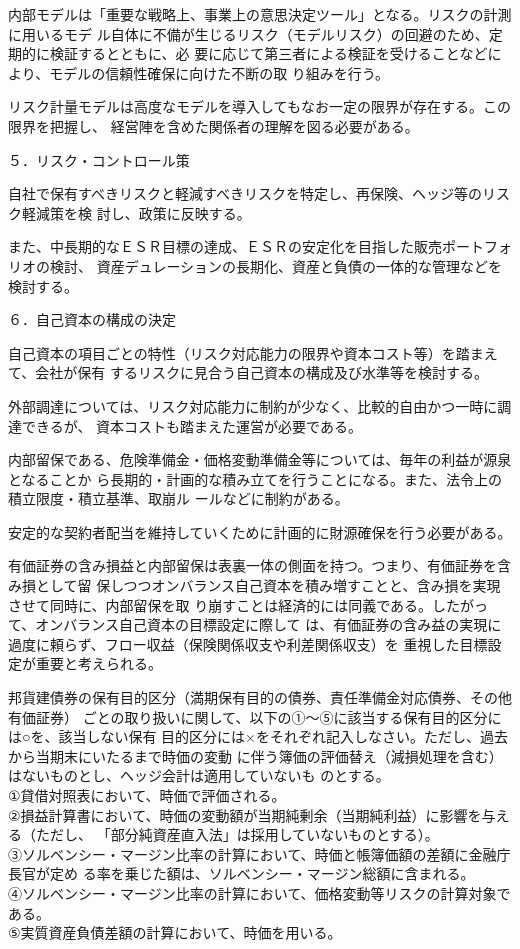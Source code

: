 \documentclass[report,gutter=10mm,fore-edge=10mm,uplatex,dvipdfmx]{jlreq}
\begin{document}
内部モデルは「重要な戦略上、事業上の意思決定ツール」となる。リスクの計測に用いるモデ
ル自体に不備が生じるリスク（モデルリスク）の回避のため、定期的に検証するとともに、必
要に応じて第三者による検証を受けることなどにより、モデルの信頼性確保に向けた不断の取
り組みを行う。

リスク計量モデルは高度なモデルを導入してもなお一定の限界が存在する。この限界を把握し、
経営陣を含めた関係者の理解を図る必要がある。

５．リスク・コントロール策

自社で保有すべきリスクと軽減すべきリスクを特定し、再保険、ヘッジ等のリスク軽減策を検
討し、政策に反映する。

また、中長期的なＥＳＲ目標の達成、ＥＳＲの安定化を目指した販売ポートフォリオの検討、
資産デュレーションの長期化、資産と負債の一体的な管理などを検討する。

６．自己資本の構成の決定

自己資本の項目ごとの特性（リスク対応能力の限界や資本コスト等）を踏まえて、会社が保有
するリスクに見合う自己資本の構成及び水準等を検討する。

外部調達については、リスク対応能力に制約が少なく、比較的自由かつ一時に調達できるが、
資本コストも踏まえた運営が必要である。

内部留保である、危険準備金・価格変動準備金等については、毎年の利益が源泉となることか
ら長期的・計画的な積み立てを行うことになる。また、法令上の積立限度・積立基準、取崩ル
ールなどに制約がある。

安定的な契約者配当を維持していくために計画的に財源確保を行う必要がある。

有価証券の含み損益と内部留保は表裏一体の側面を持つ。つまり、有価証券を含み損として留
保しつつオンバランス自己資本を積み増すことと、含み損を実現させて同時に、内部留保を取
り崩すことは経済的には同義である。したがって、オンバランス自己資本の目標設定に際して
は、有価証券の含み益の実現に過度に頼らず、フロー収益（保険関係収支や利差関係収支）を
重視した目標設定が重要と考えられる。

邦貨建債券の保有目的区分（満期保有目的の債券、責任準備金対応債券、その他有価証券）
ごとの取り扱いに関して、以下の①～⑤に該当する保有目的区分には○を、該当しない保有
目的区分には×をそれぞれ記入しなさい。ただし、過去から当期末にいたるまで時価の変動
に伴う簿価の評価替え（減損処理を含む）はないものとし、ヘッジ会計は適用していないも
のとする。\\
①貸借対照表において、時価で評価される。\\
②損益計算書において、時価の変動額が当期純剰余（当期純利益）に影響を与える（ただし、
「部分純資産直入法」は採用していないものとする）。\\
③ソルベンシー・マージン比率の計算において、時価と帳簿価額の差額に金融庁長官が定め
る率を乗じた額は、ソルベンシー・マージン総額に含まれる。\\
④ソルベンシー・マージン比率の計算において、価格変動等リスクの計算対象である。\\
⑤実質資産負債差額の計算において、時価を用いる。\\
\end{document}
